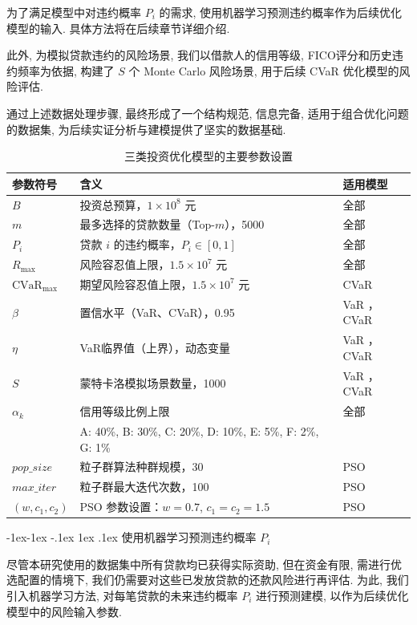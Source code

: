 \documentclass{write_paper}
\makeatletter
\renewcommand\subsection{\@startsection{subsection}{2}{\z@}%
                                     {-1ex\@plus -1ex \@minus -.1ex}%
                                     {1ex \@plus .1ex}%
                                     {\normalfont \normalsize \bfseries}}
\makeatother
\begin{document}
为了满足模型中对违约概率 $P_i$ 的需求, 使用机器学习预测违约概率作为后续优化模型的输入. 具体方法将在后续章节详细介绍.

此外, 为模拟贷款违约的风险场景, 我们以借款人的信用等级, FICO评分和历史违约频率为依据, 构建了 $S$ 个 Monte Carlo 风险场景, 用于后续 CVaR 优化模型的风险评估. 

通过上述数据处理步骤, 最终形成了一个结构规范, 信息完备, 适用于组合优化问题的数据集, 为后续实证分析与建模提供了坚实的数据基础. 

\begin{table}[htbp]
\centering
\caption{三类投资优化模型的主要参数设置}
\begin{tabular}{lll}
\toprule
 {参数符号} &{含义} &{适用模型} \\
\midrule
$B$ & 投资总预算，$1 \times 10^8$ 元 & 全部 \\
$m$ & 最多选择的贷款数量（Top-$m$），5000 & 全部 \\
$P_i$ & 贷款 $i$ 的违约概率，$P_i \in [0, 1]$ & 全部 \\
$R_{\max}$ & 风险容忍值上限，$1.5 \times 10^7$ 元 & 全部 \\
$\text{CVaR}_{\max}$ & 期望风险容忍值上限，$1.5 \times 10^7$ 元 & CVaR\\
$\beta$ & 置信水平（VaR、CVaR），0.95 & VaR ，CVaR\\
$\eta$ & VaR临界值（上界），动态变量 & VaR ，CVaR\\
$S$ & 蒙特卡洛模拟场景数量，1000 & VaR ，CVaR\\
$\alpha_k$ & 信用等级比例上限 & 全部\\
& \quad A: 40\%, B: 30\%, C: 20\%, D: 10\%, E: 5\%, F: 2\%, G: 1\% & \\
$pop\_size$ & 粒子群算法种群规模，30 & PSO  \\
$max\_iter$ & 粒子群最大迭代次数，100 & PSO  \\
$(w, c_1, c_2)$ & PSO 参数设置：$w=0.7$, $c_1=c_2=1.5$ & PSO  \\
\bottomrule
\end{tabular}
\label{tab:three-model-params}
\end{table}
\subsection{使用机器学习预测违约概率 $P_i$}
\label{subsec:predict_p_i}

尽管本研究使用的数据集中所有贷款均已获得实际资助, 但在资金有限, 需进行优选配置的情境下, 我们仍需要对这些已发放贷款的还款风险进行再评估. 为此, 我们引入机器学习方法, 对每笔贷款的未来违约概率 $P_i$ 进行预测建模, 以作为后续优化模型中的风险输入参数. 
\end{document}
